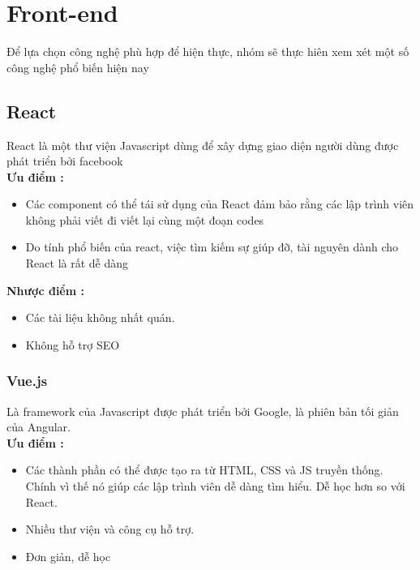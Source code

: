 
\section{Front-end}
Để lựa chọn công nghệ phù hợp để hiện thực, nhóm sẽ thực hiên xem xét một số công nghệ phổ biến hiện nay

\subsection{React}
\hspace*{0.5cm} React là một thư viện Javascript dùng để xây dựng giao diện người dùng được phát triển bởi facebook\\

\textbf{Ưu điểm \cite{technologyFE}:}
\begin{itemize}
    \item Các component có thể tái sử dụng của React đảm bảo rằng các lập trình viên không phải viết đi viết lại cùng một đoạn codes
    \item Do tính phổ biến của react, việc tìm kiếm sự giúp đỡ, tài nguyên dành cho React là rất dễ dàng
\end{itemize}

\textbf{Nhược điểm \cite{technologyFE}:}
\begin{itemize}
    \item Các tài liệu không nhất quán.
    \item Không hỗ trợ SEO
\end{itemize}

\subsubsection{Vue.js}

\hspace*{0.5cm} Là framework của Javascript được phát triển bởi Google, là phiên bản tối giản của Angular.    \\


\textbf{Ưu điểm \cite{technologyFE}:}
\begin{itemize}
    \item Các thành phần có thể được tạo ra từ HTML, CSS và JS truyền thống. Chính vì thế nó giúp các lập trình viên dễ dàng tìm hiểu. Dễ học hơn so với React.
    \item Nhiều thư viện và công cụ hỗ trợ.
    \item Đơn giản, dễ học
\end{itemize}

